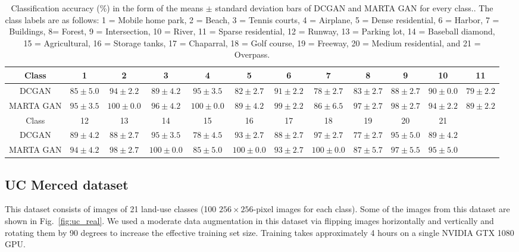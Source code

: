 \documentclass[journal]{IEEEtran}
\begin{document}
\begin{table*}
	\centering
	\scriptsize 
	\caption{ Classification accuracy (\%) in the form of the means $\pm$ standard deviation bars of DCGAN and MARTA GAN for every class.. The class labels are as follows: 1 = Mobile home park, 2 = Beach, 3 = Tennis courts, 4 = Airplane, 5 = Dense residential, 6 = Harbor, 7 = Buildings, 8= Forest, 9 = Intersection, 10 = River, 11 = Sparse residential, 12 = Runway, 13 = Parking lot, 14 = Baseball diamond, 15 = Agricultural, 16 = Storage tanks, 17 = Chaparral, 18 = Golf course, 19 = Freeway, 20 = Medium residential, and 21 = Overpass.}
	\vspace{-0.5em}
	\label{tab:compare_acc}
	\begin{tabular}{|c|ccccccccccc|}
     \hline
		
		Class&1& 2 &3& 4 & 5 & 	6& 7 &8 & 9 &10&11\\ 
		\hline
		DCGAN &$85\pm5.0$ & $94\pm2.2$ & $89\pm4.2$ & $95\pm3.5$ & $82\pm2.7$ & 
			$91\pm2.2$& $78\pm2.7$ & $83\pm2.7$ & $88\pm2.7$ & $90\pm0.0$ & $79\pm2.2$ \\ 
		
		MARTA GAN &$95\pm3.5$& $100\pm0.0$ & $96\pm4.2$ & $100\pm0.0$ &$89\pm4.2$&
			$99\pm2.2$& $86\pm6.5$ & $97\pm2.7$ & $98\pm2.7$ &$94\pm2.2$& $89\pm2.2$
			\\ 
	\hline
		Class&12 & 13 & 14 & 15 & 16 &17 &18 &19 &20 &21 &\\ 
	\hline	
		DCGAN& $89\pm4.2$ & $88\pm2.7$ & $95\pm3.5$ & $78\pm4.5$ & 
		$93\pm2.7$& $88\pm2.7$ & $97\pm2.7$ & $77\pm2.7$ & $95\pm5.0$ & 	$89\pm4.2$&\\ 
		MARTA GAN&  $94\pm4.2$ & $98\pm2.7$ & $100\pm0.0$ &$85\pm5.0$
		&	$100\pm0.0$& $93\pm2.7$ & $100\pm0.0$ & $87\pm5.7$ &$97\pm5.5$&$95\pm5.0$ &

	\\ 
	\hline
	\end{tabular}
\vspace{-6mm}
\end{table*}


\subsection{UC Merced dataset}

This dataset consists of images of 21 land-use classes (100 $256\times256$-pixel images for each class).
Some of the images from this dataset are shown in Fig.~\ref{fig:uc_real}. We used a moderate data augmentation in this dataset via flipping images horizontally and vertically and rotating them by 90 degrees to increase the effective training set size. Training takes approximately 4 hours on a single NVIDIA GTX 1080 GPU.
\end{document}
